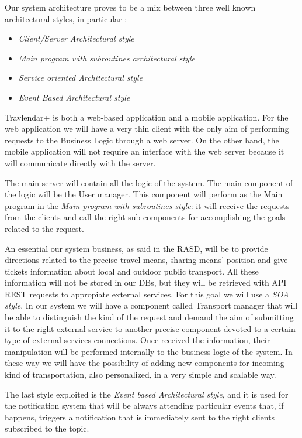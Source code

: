 Our system architecture proves to be a mix between three well known architectural styles, in particular : 

\begin{itemize}
\setlength{\leftskip}{0.5cm}
\item \emph{Client/Server Architectural style}
\item \emph{Main program with subroutines architectural style}
\item \emph{Service oriented Architectural style}
\item \emph{Event Based Architectural style}
\end{itemize}

Travlendar+ is both a web-based application and a mobile application. For the web application we will have a very thin client with the only aim of performing requests to the Business Logic through a web server.
On the other hand, the mobile application will not require an interface with the web server because it will communicate directly with the server.
\\\par
The main server will contain all the logic of the system. The main component of the logic will be the User manager. This component will perform as the Main program in the \emph{Main program with subroutines style}: it will receive the requests from the clients and call the right sub-components for accomplishing the goals related to the request.
\\\par
An essential our system business, as said in the RASD, will be to provide directions related to the precise travel means, sharing means’ position and give tickets information about local and outdoor public transport. All these information will not be stored in our DBs, but they will be retrieved with API REST requests to appropiate external services. For this goal we will use a \emph{SOA style}. 
In our system we will have a component called Transport manager that will be able to distinguish the kind of the request and demand the aim of submitting it to the right external service to another precise component devoted to a certain type of external services connections. Once received the information, their manipulation will be performed internally to the business logic of the system. In these way we will have the possibility of adding new components for incoming kind of transportation, also personalized, in a very simple and scalable way.
\\\par
The last style exploited is the \emph{Event based Architectural style}, and it is used for the notification system that will be always attending particular events that, if happens, triggers a notification that is immediately sent to the right clients subscribed to the topic. 

